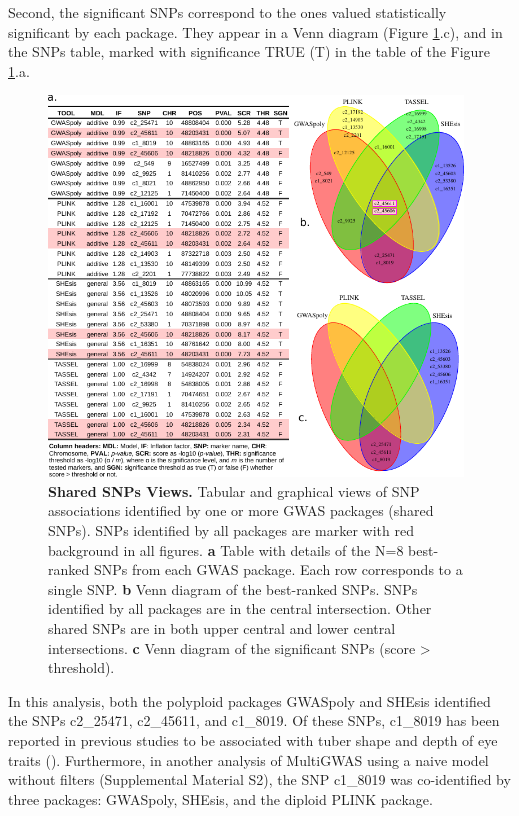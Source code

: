 \documentclass{article}
\begin{document}
Second, the significant SNPs correspond to the ones valued statistically significant by each package. They appear in a Venn diagram (Figure \ref{fig:Table-Shared-SNPs}.c), and in the SNPs table, marked with significance TRUE (T) in the table of the Figure \ref{fig:Table-Shared-SNPs}.a.

\begin{figure}[H]
\begin{centering}
\includegraphics[width=11cm]{06_figure-table-venn-best} 
\par\end{centering}
\caption{\textbf{Shared SNPs Views.} Tabular and graphical views of SNP associations identified by one or more GWAS packages (shared SNPs). SNPs identified by all packages are marker with red background in all figures. \textbf{a} Table with details of the N=8 best-ranked SNPs from each GWAS package. Each row corresponds to a single SNP. \textbf{b} Venn diagram of the best-ranked SNPs. SNPs identified by all packages are in the central intersection. Other shared SNPs are in both upper central and lower central intersections. \textbf{c} Venn diagram of the significant SNPs (score \textgreater{} threshold). \label{fig:Table-Shared-SNPs}}
\end{figure}

In this analysis, both the polyploid packages GWASpoly and SHEsis identified the SNPs c2\_25471, c2\_45611, and c1\_8019. Of these SNPs, c1\_8019 has been reported in previous studies to be associated with tuber shape and depth of eye traits (\cite{Rosyara2016, Sharma2018}). Furthermore, in another analysis of MultiGWAS using a naive model without filters (Supplemental Material S2), the SNP c1\_8019 was co-identified by three packages: GWASpoly, SHEsis, and the diploid PLINK package.
\end{document}
